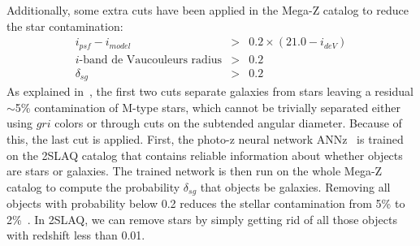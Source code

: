 Additionally, some extra cuts have been applied in the Mega-Z catalog to reduce the star contamination:
\begin{eqnarray}
i_{psf}-i_{model}&>&0.2\times(21.0-i_{deV})\\
i\text{-band de Vaucouleurs radius}&>&0.2\\
\delta_{sg} &>& 0.2
\end{eqnarray}
As explained in~\citet{Collister2007}, the first two cuts separate galaxies from stars leaving a residual $\sim$5\% contamination of M-type stars, which cannot be trivially separated either using $gri$ colors or through cuts on the subtended angular diameter. Because of this, the last cut is applied. First, the photo-z neural network ANNz~\citep{Collister2004} is trained on the 2SLAQ catalog that contains reliable information about whether objects are stars or galaxies. The trained network is then run on the whole Mega-Z catalog to compute the probability $\delta_{sg}$ that objects be galaxies. Removing all objects with probability below 0.2 reduces the stellar contamination from 5\% to 2\%~\citep{Collister2007}. In 2SLAQ, we can remove stars by simply getting rid of all those objects with redshift less than 0.01. 
